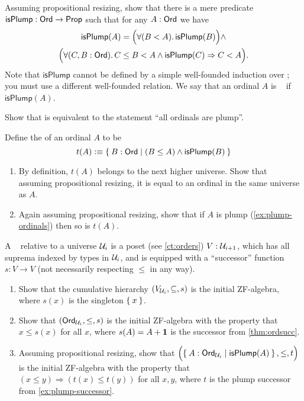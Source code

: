 \documentclass[hott-all.tex]{subfiles}
\begin{document}
% 
\begin{ex}
  Assuming propositional resizing, show that there is a mere predicate $\mathsf{isPlump}:\mathsf{Ord}\to\mathsf{Prop}$ such that for any $A:\mathsf{Ord}$ we have
  \begin{multline*}\fakelabel{eq:plump}
    \mathsf{isPlump}(A) = \Parens{\fall{B<A} \mathsf{isPlump}(B)} \wedge\narrowbreak
    \Parens{\fall{C,B:\ord} C\le B < A \wedge \mathsf{isPlump}(C) \Rightarrow C < A}.
  \end{multline*}
  Note that $\mathsf{isPlump}$ cannot be defined by a simple well-founded induction over \ord; you must use a different well-founded relation.
  We say that an ordinal $A$ is ~\cite{taylor:ordinals,Taylor99} if $\mathsf{isPlump}(A)$.
\end{ex}
% 
\begin{ex}
  Show that \LEM{} is equivalent to the statement ``all ordinals are plump''.
\end{ex}
% 
\begin{ex}
  Define the  of an ordinal $A$ to be
  \[ t(A) \defeq \setof{ B:\ord | (B\le A) \wedge \mathsf{isPlump}(B) } \]
  \begin{enumerate}
  \item By definition, $t(A)$ belongs to the next higher universe.
    Show that assuming propositional resizing, it is equal to an ordinal in the same universe as $A$.
  \item Again assuming propositional resizing, show that if $A$ is plump (\cref{ex:plump-ordinals}) then so is $t(A)$.
  \end{enumerate}
\end{ex}
% 
\begin{ex}
  A ~\cite{JoyalMoerdijk1995}
  relative to a universe $\mathcal{U}_i$ is a poset (see \cref{ct:orders}) $V:\mathcal{U}_{i+1}$, which has all suprema indexed by types in $\mathcal{U}_i$, and is equipped with a ``successor'' function $s:V\to V$ (not necessarily respecting $\le$ in any way).
  \begin{enumerate}
  \item Show that the cumulative hierarchy $(V_{\mathcal{U}_i},\subseteq,s)$ is the initial ZF-algebra, where $s(x)$ is the singleton $\Set{x}$.
  \item Show that $(\mathsf{Ord}_{\mathcal{U}_i},\le,s)$ is the initial ZF-algebra with the property that $x\le s(x)$ for all $x$, where $s(A)=A+\mathbf{1}$ is the successor from \cref{thm:ordsucc}.
  \item Assuming propositional resizing, show that $\Parens{\setof{A:\ord_{\UU_i} | \mathsf{isPlump}(A) },\le,t}$ is the initial ZF-algebra with the property that $(x\le y) \Rightarrow (t(x)\le t(y))$ for all $x,y$, where $t$ is the plump successor from \cref{ex:plump-successor}.
  \end{enumerate}
\end{ex}
\end{document}
